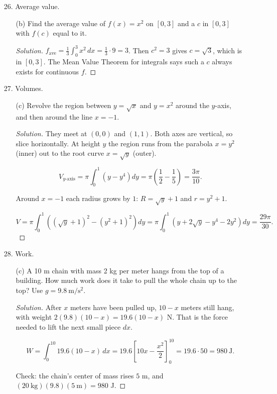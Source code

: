 \documentclass[12pt]{article}
\newcommand\parens[1]{\left( #1 \right)}
\newcommand\brac[1]{\left[ #1 \right]}
\newenvironment{solution}
  {\renewcommand\qedsymbol{$\blacksquare$}\begin{proof}[Solution]}
  {\end{proof}}
\begin{document}
\begin{enumerate}
\begin{enumerate}
\begin{solution}
\[\int_0^9\parens{\sqrt x - \frac x3}dx = \brac{\frac23x^{3/2} - \frac{x^2}{6}}_0^9 = 18 - \frac{27}{2} = \frac92.\]

In $y$, solve each curve for $x$: the line is $x = 3y$ (on the right) and the root is $x = y^2$ (on the left).

\[\int_0^3\parens{3y - y^2}dy = \frac{27}{2} - 9 = \frac92.\]
\end{solution}
\end{enumerate}
\item[26.] Average value.
\begin{enumerate}
\item[(b)] Find the average value of $f(x) = x^2$ on $[0,3]$ and a $c$ in $[0,3]$ with $f(c)$ equal to it.
\begin{solution}
$f_{\text{ave}} = \frac13\int_0^3x^2\,dx = \frac13\cdot 9 = 3$. Then $c^2 = 3$ gives $c = \sqrt3$, which is in $[0,3]$. The Mean Value Theorem for integrals says such a $c$ always exists for continuous $f$.
\end{solution}
\end{enumerate}
\item[27.] Volumes.
\begin{enumerate}
\item[(c)] Revolve the region between $y = \sqrt{x}$ and $y = x^2$ around the $y$-axis, and then around the line $x = -1$.
\begin{solution}
They meet at $(0,0)$ and $(1,1)$. Both axes are vertical, so slice horizontally. At height $y$ the region runs from the parabola $x = y^2$ (inner) out to the root curve $x = \sqrt y$ (outer).

\[V_{y\text{-axis}} = \pi\int_0^1\parens{y - y^4}dy = \pi\parens{\frac12 - \frac15} = \frac{3\pi}{10}.\]

Around $x = -1$ each radius grows by $1$: $R = \sqrt y + 1$ and $r = y^2 + 1$.

\[V = \pi\int_0^1\parens{(\sqrt y + 1)^2 - (y^2+1)^2}dy = \pi\int_0^1\parens{y + 2\sqrt y - y^4 - 2y^2}dy = \frac{29\pi}{30}.\]
\end{solution}
\end{enumerate}
\item[28.] Work.
\begin{enumerate}
\item[(c)] A 10 m chain with mass 2 kg per meter hangs from the top of a building. How much work does it take to pull the whole chain up to the top? Use $g = 9.8\ \text{m}/\text{s}^2$.
\begin{solution}
After $x$ meters have been pulled up, $10 - x$ meters still hang, with weight $2(9.8)(10-x) = 19.6(10-x)$ N. That is the force needed to lift the next small piece $dx$.

\[W = \int_0^{10} 19.6(10-x)\,dx = 19.6\brac{10x - \frac{x^2}{2}}_0^{10} = 19.6\cdot 50 = 980\ \text{J}.\]

Check: the chain's center of mass rises $5$ m, and $(20\ \text{kg})(9.8)(5\ \text{m}) = 980$ J.
\end{solution}
\end{enumerate}
\end{enumerate}
\end{document}
